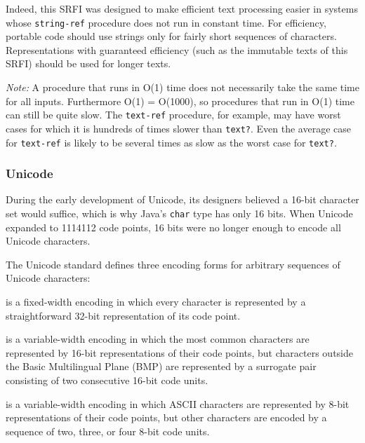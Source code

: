 Indeed, this SRFI was designed to make efficient text processing easier
in systems whose \texttt{string-ref} procedure does not run in constant
time. For efficiency, portable code should use strings only for fairly
short sequences of characters. Representations with guaranteed
efficiency (such as the immutable texts of this SRFI) should be used for
longer texts.

\emph{Note:} A procedure that runs in O(1) time does not necessarily
take the same time for all inputs. Furthermore O(1) = O(1000), so
procedures that run in O(1) time can still be quite slow. The
\texttt{text-ref} procedure, for example, may have worst cases for which
it is hundreds of times slower than \texttt{text?}. Even the average
case for \texttt{text-ref} is likely to be several times as slow as the
worst case for \texttt{text?}.

\subsubsection{{Unicode}}\label{unicode}


During the early development of Unicode, its designers believed a 16-bit
character set would suffice, which is why Java's \texttt{char} type has
only 16 bits. When Unicode expanded to 1114112 code points, 16 bits were
no longer enough to encode all Unicode characters.

The Unicode standard defines three encoding forms for arbitrary
sequences of Unicode characters:

\begin{description}
\tightlist
\item[ UTF-32 ]
is a fixed-width encoding in which every character is represented by a
straightforward 32-bit representation of its code point.
\item[ UTF-16 ]
is a variable-width encoding in which the most common characters are
represented by 16-bit representations of their code points, but
characters outside the Basic Multilingual Plane (BMP) are represented by
a surrogate pair consisting of two consecutive 16-bit code units.
\item[ UTF-8 ]
is a variable-width encoding in which ASCII characters are represented
by 8-bit representations of their code points, but other characters are
encoded by a sequence of two, three, or four 8-bit code units.
\end{description}

